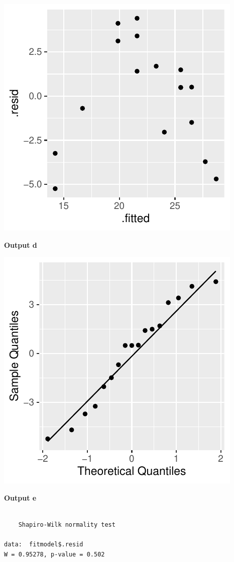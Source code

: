 \documentclass[]{article}
\begin{document}
\includegraphics{modelquestions_files/figure-latex/unnamed-chunk-4-1.pdf}

\textbf{Output d}

\includegraphics{modelquestions_files/figure-latex/unnamed-chunk-5-1.pdf}

\textbf{Output e}

\begin{verbatim}

    Shapiro-Wilk normality test

data:  fitmodel$.resid
W = 0.95278, p-value = 0.502
\end{verbatim}
\end{document}
